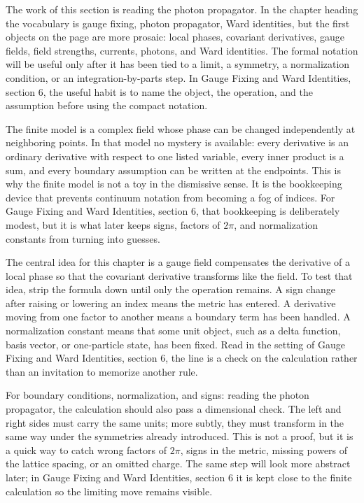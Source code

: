 The work of this section is reading the photon propagator.  In the chapter heading the vocabulary is gauge fixing, photon propagator, Ward identities, but the first objects on the page are more prosaic: local phases, covariant derivatives, gauge fields, field strengths, currents, photons, and Ward identities.  The formal notation will be useful only after it has been tied to a limit, a symmetry, a normalization condition, or an integration-by-parts step.  In Gauge Fixing and Ward Identities, section 6, the useful habit is to name the object, the operation, and the assumption before using the compact notation.

The finite model is a complex field whose phase can be changed independently at neighboring points.  In that model no mystery is available: every derivative is an ordinary derivative with respect to one listed variable, every inner product is a sum, and every boundary assumption can be written at the endpoints.  This is why the finite model is not a toy in the dismissive sense.  It is the bookkeeping device that prevents continuum notation from becoming a fog of indices.  For Gauge Fixing and Ward Identities, section 6, that bookkeeping is deliberately modest, but it is what later keeps signs, factors of \(2\pi\), and normalization constants from turning into guesses.

The central idea for this chapter is a gauge field compensates the derivative of a local phase so that the covariant derivative transforms like the field.  To test that idea, strip the formula down until only the operation remains.  A sign change after raising or lowering an index means the metric has entered.  A derivative moving from one factor to another means a boundary term has been handled.  A normalization constant means that some unit object, such as a delta function, basis vector, or one-particle state, has been fixed.  Read in the setting of Gauge Fixing and Ward Identities, section 6, the line is a check on the calculation rather than an invitation to memorize another rule.

For boundary conditions, normalization, and signs: reading the photon propagator, the calculation should also pass a dimensional check.  The left and right sides must carry the same units; more subtly, they must transform in the same way under the symmetries already introduced.  This is not a proof, but it is a quick way to catch wrong factors of \(2\pi\), signs in the metric, missing powers of the lattice spacing, or an omitted charge.  The same step will look more abstract later; in Gauge Fixing and Ward Identities, section 6 it is kept close to the finite calculation so the limiting move remains visible.

